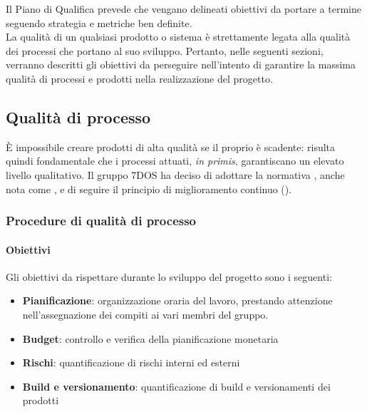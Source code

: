 Il Piano di Qualifica prevede che vengano delineati obiettivi da portare a termine seguendo strategia e metriche ben definite.\\
La qualità di un qualsiasi prodotto o sistema è strettamente legata alla qualità dei processi che portano al suo sviluppo. Pertanto, nelle seguenti sezioni, verranno descritti gli obiettivi da perseguire nell'intento di garantire la massima qualità di processi e prodotti nella realizzazione del progetto.

\subsection{Qualità di processo}
	È impossibile creare prodotti di alta qualità se il proprio  è scadente: risulta quindi fondamentale che i processi attuati, \emph{in primis}, garantiscano un elevato livello qualitativo. Il gruppo 7DOS ha deciso di adottare la normativa , anche nota come , e di seguire il principio di miglioramento continuo (). 


\subsubsection{Procedure di qualità di processo}

\paragraph{Obiettivi}
Gli obiettivi da rispettare durante lo sviluppo del progetto sono i seguenti:

\begin{itemize}
	\item{\textbf{Pianificazione}: organizzazione oraria del lavoro, prestando attenzione nell'assegnazione dei compiti ai vari membri del gruppo. 	
	}
	\item{\textbf{Budget}: controllo e verifica della pianificazione monetaria
	}
	\item{\textbf{Rischi}: quantificazione di rischi interni ed esterni
	}
	\item{\textbf{Build e versionamento}: quantificazione di build e versionamenti dei prodotti
	}
\end{itemize}

